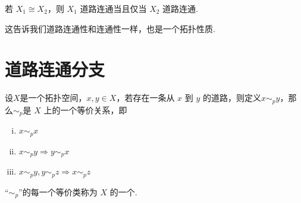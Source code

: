 \begin{theorem}[][thm:7.4]
    若 $X_1\cong X_2$，则 $X_1$ 道路连通当且仅当 $X_2$ 道路连通.
\end{theorem}
这告诉我们道路连通性和连通性一样，也是一个拓扑性质. 

\section{道路连通分支}

\begin{definition}[道路连通分支][def:7.6]
    设$X$是一个拓扑空间，$x,y\in X$，若存在一条从 $x$ 到 $y$ 的道路，则定义$x\sim_p y$，那么$\sim_p$是 $X$ 上的一个等价关系，即
    \begin{enumerate}[(i)]
        \item $x\sim_p x$
        \item $x\sim_p y\Rightarrow y\sim_p x$
        \item $x\sim_p y,y\sim_p z\Rightarrow x\sim_p z$
    \end{enumerate}
    “$\sim_p$”的每一个等价类称为 $X$ 的一个.
\end{definition}
